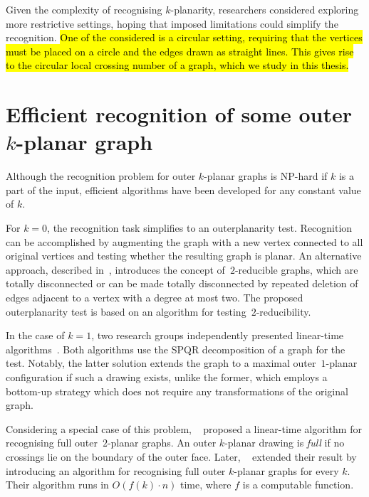 Given the complexity of recognising \(k\)-planarity, researchers considered exploring more restrictive settings, hoping that imposed limitations could simplify the recognition. \hl{One of the considered is a circular setting, requiring that the vertices must be placed on a circle and the edges drawn as straight lines. This gives rise to the circular local crossing number of a graph, which we study in this thesis.}


\section{Efficient recognition of some outer \(k\)-planar graph}

Although the recognition problem for outer \(k\)-planar graphs is NP-hard if \(k\) is a part of the input, efficient algorithms have been developed for any constant value of \(k\).

For \(k = 0\), the recognition task simplifies to an outerplanarity test. Recognition can be accomplished by augmenting the graph with a new vertex connected to all original vertices and testing whether the resulting graph is planar. An alternative approach, described in~\cite{linear-op}, introduces the concept of~\(2\)-reducible graphs, which are totally disconnected or can be made totally disconnected by repeated deletion of edges adjacent to a vertex with a degree at most two. The proposed outerplanarity test is based on an algorithm for testing~\(2\)-reducibility.

In the case of \(k = 1\), two research groups independently presented linear-time algorithms~\cite{linear-o1p_, linear-o1p}. Both algorithms use the SPQR decomposition of a graph for the test. Notably, the latter solution extends the graph to a maximal outer~\(1\)-planar configuration if such a drawing exists, unlike the former, which employs a bottom-up strategy which does not require any transformations of the original graph.

Considering a special case of this problem, \citeauthor{linear-full-o2p}~\cite{linear-full-o2p} proposed a linear-time algorithm for recognising full outer~\(2\)-planar graphs. An outer \(k\)-planar drawing is \emph{full} if no crossings lie on the boundary of the outer face. Later, \citeauthor{linear-full-okp}~\cite{linear-full-okp} extended their result by introducing an algorithm for recognising full outer \(k\)-planar graphs for every \(k\). Their algorithm runs in \(O(f(k) \cdot n)\) time, where \(f\) is a computable function.

